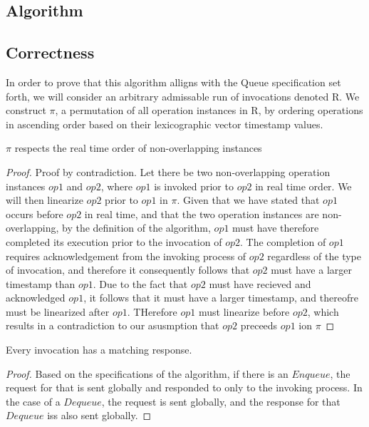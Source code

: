 \documentclass[a4paper,USenglish]{lipics-v2021} %
\begin{document}
\subsection{Algorithm}

\subsection{Correctness}
In order to prove that this algorithm alligns with the Queue specification set forth, we will consider an arbitrary admissable run of invocations denoted R. We construct $\pi$, a permutation of all operation instances in R, by ordering operations in ascending order based on their lexicographic vector timestamp values. 
\begin{lemma}
  $\pi$ respects the real time order of non-overlapping instances
\end{lemma}
\begin{proof}
  Proof by contradiction. Let there be two non-overlapping operation instances $op1$ and $op2$, where $op1$ is invoked prior to $op2$ in real time order. We will then linearize $op2$ prior to $op1$ in $\pi$. 
  Given that we have stated that $op1$ occurs before $op2$ in real time, and that the two operation instances are non-overlapping, by the definition of the algorithm, $op1$ must have therefore completed its execution prior to the invocation of $op2$. The completion of $op1$ requires acknowledgement from the invoking process of $op2$ regardless of the type of invocation, and therefore it consequently follows that $op2$ must have a larger timestamp than $op1$. Due to the fact that $op2$ must have recieved and acknowledged $op1$, it follows that it must have a larger timestamp, and thereofre must be linearized after $op1$. THerefore $op1$ must linearize before $op2$, which results in a contradiction to our asusmption that $op2$ preceeds $op1$ ion $\pi$
\end{proof}

\begin{lemma}
  Every invocation has a matching response.
\end{lemma}

\begin{proof}
Based on the specifications of the algorithm, if there is an $Enqueue$, the request for that is sent globally and responded to only to the invoking process.  In the case of a $Dequeue$, the request is sent globally, and the response for that $Dequeue$ iss also sent globally.  
\end{proof}
\end{document}

